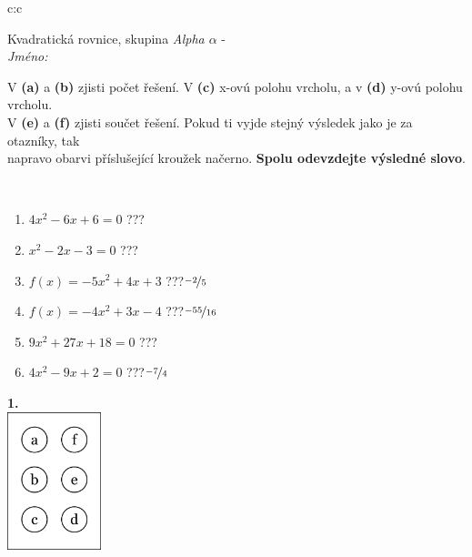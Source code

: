 \documentclass[10pt]{report}
\begin{document}
\thispagestyle{empty}
\begin{tabular}{c:c}
\begin{minipage}[c][104.5mm][t]{0.5\linewidth}
\begin{center}
\vspace{7mm}
{\huge Kvadratická rovnice, skupina \textit{Alpha $\alpha$} -}\\[5mm]
\textit{Jméno:}\phantom{xxxxxxxxxxxxxxxxxxxxxxxxxxxxxxxxxxxxxxxxxxxxxxxxxxxxxxxxxxxxxxxxx}\\[5mm]
\begin{minipage}{0.95\linewidth}
\begin{center}
V \textbf{(a)} a \textbf{(b)} zjisti počet řešení. V \textbf{(c)} x-ovú polohu vrcholu, a v \textbf{(d)} y-ovú polohu vrcholu.\\V \textbf{(e)} a \textbf{(f)} zjisti součet řešení. Pokud ti vyjde stejný výsledek jako je za otazníky, tak\\napravo obarvi příslušející kroužek načerno. \textbf{Spolu odevzdejte výsledné slovo}.
\end{center}
\end{minipage}
\\[1mm]
\begin{minipage}{0.79\linewidth}
\begin{center}
\begin{varwidth}{\linewidth}
\begin{enumerate}
\Large
\item $4x^2-6x+6=0$\quad \dotfill\; ???\;\dotfill {}
\item $x^2-2x-3=0$\quad \dotfill\; ???\;\dotfill {}
\item $f(x)=-5x^2+4x+3$\quad \dotfill\; ???\;\dotfill \quad $\nicefrac{-2}{5}$
\item $f(x)=-4x^2+3x-4$\quad \dotfill\; ???\;\dotfill \quad $\nicefrac{-55}{16}$
\item $9x^2+27x+18=0$\quad \dotfill\; ???\;\dotfill {}
\item $4x^2-9x+2=0$\quad \dotfill\; ???\;\dotfill \quad $\nicefrac{-7}{4}$
\end{enumerate}
\end{varwidth}
\end{center}
\end{minipage}
\begin{minipage}{0.20\linewidth}
\begin{center}
{\Huge\bfseries 1.} \\[2mm]
\includegraphics[height=40mm]{../images/braille.png}

\end{center}
\end{minipage}
\end{center}
\end{minipage}
\end{tabular}
\end{document}
